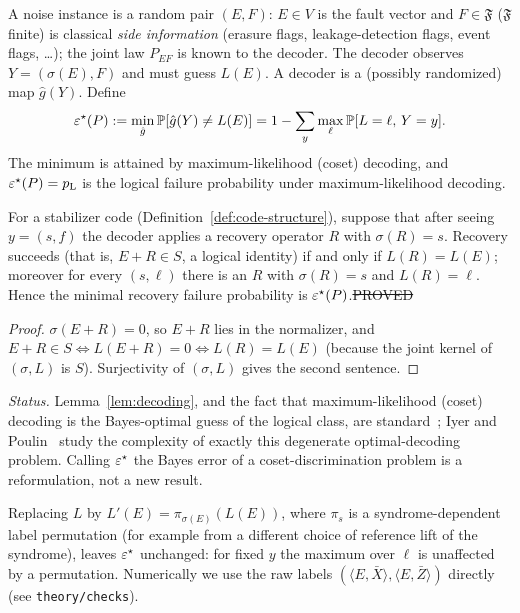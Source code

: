 \begin{definition}\label{def:instance}
A noise instance is a random pair $(E,F)$: $E\in V$ is the fault vector and $F\in\mathfrak F$ ($\mathfrak F$ finite) is classical \emph{side information}
(erasure flags, leakage-detection flags, event flags, \dots); the joint law $P_{EF}$ is known to the decoder. The decoder observes
$Y=(\sigma(E),F)$ and must guess $L(E)$. A decoder is a (possibly randomized) map $\hat g(Y)$. Define
\[
\varepsilon^{\star}(P):=\min_{\hat g}\mathbb{P}[\hat g(Y)\neq L(E)]
=1-\sum_{y}\max_{\ell}\mathbb{P}[L=\ell,\,Y=y].
\]
The minimum is attained by maximum-likelihood (coset) decoding, and $\varepsilon^{\star}(P)=p_{\mathrm{L}}$ is the logical failure probability under maximum-likelihood decoding.
\end{definition}

\begin{lemma}\label{lem:decoding}
For a stabilizer code (Definition~\ref{def:code-structure}), suppose that after seeing $y=(s,f)$ the decoder applies a recovery operator $R$ with $\sigma(R)=s$.
Recovery succeeds (that is, $E+R\in S$, a logical identity) if and only if $L(R)=L(E)$; moreover for every $(s,\ell)$ there is an $R$ with
$\sigma(R)=s$ and $L(R)=\ell$. Hence the minimal recovery failure probability is $\varepsilon^{\star}(P)$.\hfill\st{PROVED}
\end{lemma}
\begin{proof}
$\sigma(E+R)=0$, so $E+R$ lies in the normalizer, and $E+R\in S\iff L(E+R)=0\iff L(R)=L(E)$
(because the joint kernel of $(\sigma,L)$ is $S$). Surjectivity of $(\sigma,L)$ gives the second sentence.
\end{proof}
\noindent\emph{Status.} Lemma~\ref{lem:decoding}, and the fact that maximum-likelihood (coset) decoding is the Bayes-optimal guess of the logical class, are standard~\cite{DKLP,IyerPoulin,BSV}; Iyer and Poulin~\cite{IyerPoulin} study the complexity of exactly this degenerate optimal-decoding problem. Calling $\varepsilon^{\star}$ the Bayes error of a coset-discrimination problem is a reformulation, not a new result.

\begin{remark}
Replacing $L$ by $L'(E)=\pi_{\sigma(E)}(L(E))$, where $\pi_s$ is a syndrome-dependent label permutation (for example from a different choice of
reference lift of the syndrome), leaves $\varepsilon^{\star}$ unchanged: for fixed $y$ the maximum over $\ell$ is unaffected by a permutation. Numerically we use the raw labels
$(\langle E,\bar X\rangle,\langle E,\bar Z\rangle)$ directly (see \texttt{theory/checks}).
\end{remark}

